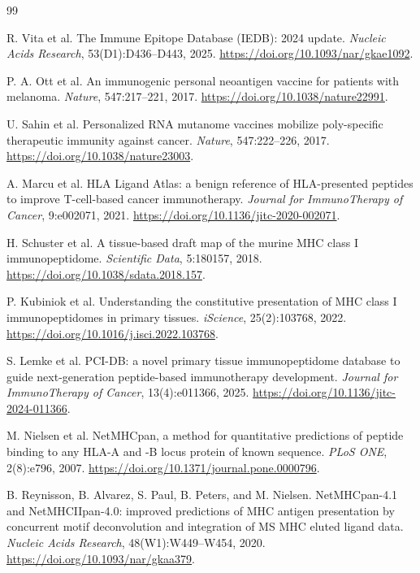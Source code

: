 \begingroup
\small
\begin{thebibliography}{99}

R. Vita et al.
\newblock The Immune Epitope Database (IEDB): 2024 update.
\newblock \emph{Nucleic Acids Research}, 53(D1):D436--D443, 2025.
\newblock \url{https://doi.org/10.1093/nar/gkae1092}.

P. A. Ott et al.
\newblock An immunogenic personal neoantigen vaccine for patients with melanoma.
\newblock \emph{Nature}, 547:217--221, 2017.
\newblock \url{https://doi.org/10.1038/nature22991}.

U. Sahin et al.
\newblock Personalized RNA mutanome vaccines mobilize poly-specific therapeutic immunity against cancer.
\newblock \emph{Nature}, 547:222--226, 2017.
\newblock \url{https://doi.org/10.1038/nature23003}.

A. Marcu et al.
\newblock HLA Ligand Atlas: a benign reference of HLA-presented peptides to improve T-cell-based cancer immunotherapy.
\newblock \emph{Journal for ImmunoTherapy of Cancer}, 9:e002071, 2021.
\newblock \url{https://doi.org/10.1136/jitc-2020-002071}.

H. Schuster et al.
\newblock A tissue-based draft map of the murine MHC class I immunopeptidome.
\newblock \emph{Scientific Data}, 5:180157, 2018.
\newblock \url{https://doi.org/10.1038/sdata.2018.157}.

P. Kubiniok et al.
\newblock Understanding the constitutive presentation of MHC class I immunopeptidomes in primary tissues.
\newblock \emph{iScience}, 25(2):103768, 2022.
\newblock \url{https://doi.org/10.1016/j.isci.2022.103768}.

S. Lemke et al.
\newblock PCI-DB: a novel primary tissue immunopeptidome database to guide next-generation peptide-based immunotherapy development.
\newblock \emph{Journal for ImmunoTherapy of Cancer}, 13(4):e011366, 2025.
\newblock \url{https://doi.org/10.1136/jitc-2024-011366}.

M. Nielsen et al.
\newblock NetMHCpan, a method for quantitative predictions of peptide binding to any HLA-A and -B locus protein of known sequence.
\newblock \emph{PLoS ONE}, 2(8):e796, 2007.
\newblock \url{https://doi.org/10.1371/journal.pone.0000796}.

B. Reynisson, B. Alvarez, S. Paul, B. Peters, and M. Nielsen.
\newblock NetMHCpan-4.1 and NetMHCIIpan-4.0: improved predictions of MHC antigen presentation by concurrent motif deconvolution and integration of MS MHC eluted ligand data.
\newblock \emph{Nucleic Acids Research}, 48(W1):W449--W454, 2020.
\newblock \url{https://doi.org/10.1093/nar/gkaa379}.


\end{thebibliography}
